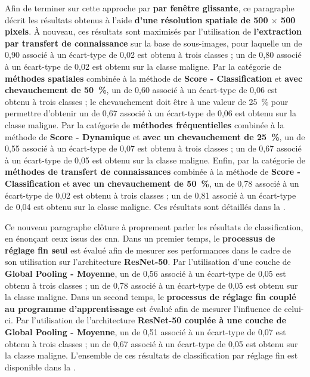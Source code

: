 Afin de terminer sur cette approche par \textbf{par fenêtre glissante}, ce paragraphe décrit les résultats obtenus à l'aide \textbf{d'une résolution spatiale de 500 $\times$ 500 pixels}. À nouveau, ces résultats sont maximisés par l'utilisation de \textbf{l'extraction par transfert de connaissance} sur la base de sous-images, pour laquelle un \fscore{} de 0,90 associé à un écart-type de 0,02 est obtenu à trois classes ; un \fscore{} de 0,80 associé à un écart-type de 0,02 est obtenu sur la classe maligne. Par la catégorie de \textbf{méthodes spatiales} combinée à la méthode de \textbf{Score - Classification} et \textbf{avec chevauchement de 50~\%}, un \fscore{} de 0,60 associé à un écart-type de 0,06 est obtenu à trois classes ; le chevauchement doit être à une valeur de 25~\% pour permettre d'obtenir un \fscore{} de 0,67 associé à un écart-type de 0,06 est obtenu sur la classe maligne. Par la catégorie de \textbf{méthodes fréquentielles} combinée à la méthode de \textbf{Score - Dynamique} et \textbf{avec un chevauchement de 25~\%}, un \fscore{} de 0,55 associé à un écart-type de 0,07 est obtenu à trois classes ; un \fscore{} de 0,67 associé à un écart-type de 0,05 est obtenu sur la classe maligne. Enfin, par la catégorie de \textbf{méthodes de transfert de connaissances} combinée à la méthode de \textbf{Score - Classification} et \textbf{avec un chevauchement de 50~\%}, un \fscore{} de 0,78 associé à un écart-type de 0,02 est obtenu à trois classes ; un \fscore{} de 0,81 associé à un écart-type de 0,04 est obtenu sur la classe maligne. Ces résultats sont détaillés dans la .\par

Ce nouveau paragraphe clôture à proprement parler les résultats de classification, en énonçant ceux issus des \gls{cnn}. Dans un premier temps, le \textbf{processus de réglage fin seul} est évalué afin de mesurer ses performances dans le cadre de son utilisation sur l'architecture \textbf{ResNet-50}. Par l'utilisation d'une couche de \textbf{Global Pooling - Moyenne}, un \fscore{} de 0,56 associé à un écart-type de 0,05 est obtenu à trois classes ; un \fscore{} de 0,78 associé à un écart-type de 0,05 est obtenu sur la classe maligne. Dans un second temps, le \textbf{processus de réglage fin couplé au programme d'apprentissage} est évalué afin de mesurer l'influence de celui-ci. Par l'utilisation de l'architecture \textbf{ResNet-50 couplée à une couche de Global Pooling - Moyenne}, un \fscore{} de 0,51 associé à un écart-type de 0,07 est obtenu à trois classes ; un \fscore{} de 0,67 associé à un écart-type de 0,05 est obtenu sur la classe maligne. L'ensemble de ces résultats de classification par réglage fin est disponible dans la .\par

